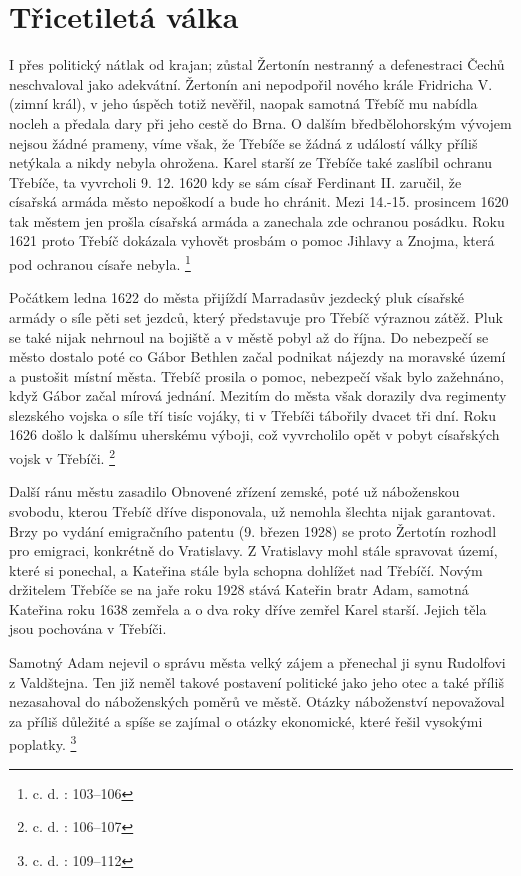 \documentclass[a4paper,oneside,12p]{report}
\begin{document}
\section{Třicetiletá válka}

I přes politický nátlak od krajan; zůstal Žertonín nestranný a defenestraci Čechů neschvaloval jako adekvátní.
Žertonín ani nepodpořil nového krále Fridricha V. (zimní král), v jeho úspěch totiž nevěřil, naopak samotná Třebíč mu nabídla nocleh a předala dary při jeho cestě do Brna.
O dalším bředbělohorským vývojem nejsou žádné prameny, víme však, že Třebíče se žádná z událostí války příliš netýkala a  nikdy nebyla ohrožena.
Karel starší ze Třebíče také zaslíbil ochranu Třebíče, ta vyvrcholi 9. 12. 1620 kdy se sám císař Ferdinant II. zaručil, že císařská armáda město nepoškodí a bude ho chránit.
Mezi 14.-15. prosincem 1620 tak městem jen prošla císařská armáda a zanechala zde ochranou posádku.
Roku 1621 proto Třebíč dokázala vyhovět prosbám o pomoc Jihlavy a Znojma, která pod ochranou císaře nebyla. \footnote{c. d. : 103--106}

Počátkem ledna 1622 do města přijíždí Marradasův jezdecký pluk císařské armády o síle pěti set jezdců, který představuje pro Třebíč výraznou zátěž. %
Pluk se také nijak nehrnoul na bojiště a v městě pobyl až do října.
Do nebezpečí se město dostalo poté co Gábor Bethlen začal podnikat nájezdy na moravské území a pustošit místní města.
Třebíč prosila o pomoc, nebezpečí však bylo zažehnáno, když Gábor začal mírová jednání.
Mezitím do města však dorazily dva regimenty slezského vojska o síle tří tisíc vojáky, ti v Třebíči tábořily dvacet tři dní.
Roku 1626 došlo k dalšímu uherskému výboji, což vyvrcholilo opět v pobyt císařských vojsk v Třebíči. \footnote{c. d. : 106--107}

Další ránu městu zasadilo Obnovené zřízení zemské, poté už náboženskou svobodu, kterou Třebíč dříve disponovala, už nemohla šlechta nijak garantovat.
Brzy po vydání emigračního patentu (9. březen 1928) se proto Žertotín rozhodl pro emigraci, konkrétně do Vratislavy.
Z Vratislavy mohl stále spravovat území, které si ponechal, a Kateřina stále byla schopna dohlížet nad Třebíčí.
Novým držitelem Třebíče se na jaře roku 1928 stává Kateřin bratr Adam, samotná Kateřina roku 1638 zemřela a o dva roky dříve zemřel Karel starší. %
Jejich těla jsou pochována v Třebíči. %

Samotný Adam nejevil o správu města velký zájem a přenechal ji synu Rudolfovi z Valdštejna.
Ten již neměl takové postavení politické jako jeho otec a také příliš nezasahoval do náboženských poměrů ve městě.
Otázky náboženství nepovažoval za příliš důležité a spíše se zajímal o otázky ekonomické, které řešil vysokými poplatky. \footnote{c. d. : 109--112}
\end{document}
